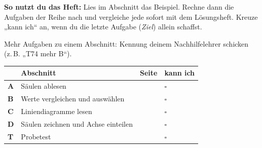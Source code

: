 \documentclass[11pt]{article}
\begin{document}
\par\smallskip
{}\par\medskip
\noindent\textbf{So nutzt du das Heft:} Lies im Abschnitt das Beispiel. Rechne dann die Aufgaben der Reihe nach und vergleiche jede sofort mit dem Lösungsheft. Kreuze „kann ich“ an, wenn du die letzte Aufgabe (\emph{Ziel}) allein schaffst.\par
\noindent Mehr Aufgaben zu einem Abschnitt: Kennung deinem Nachhilfelehrer schicken (z.\,B. „T74 mehr B“).\par\medskip
{\renewcommand{\arraystretch}{1.3}
\noindent\begin{tabular}{|>{\bfseries}p{10mm}|p{112mm}|>{\raggedleft\arraybackslash}p{10mm}|>{\centering\arraybackslash}p{14mm}|}\hline
\rowcolor{black!8} & \textbf{Abschnitt} & \textbf{Seite} & \textbf{kann ich}\\\hline
A & Säulen ablesen & \pageref{s:A} & $\square$\\\hline
B & Werte vergleichen und auswählen & \pageref{s:B} & $\square$\\\hline
C & Liniendiagramme lesen & \pageref{s:C} & $\square$\\\hline
D & Säulen zeichnen und Achse einteilen & \pageref{s:D} & $\square$\\\hline
T & Probetest & \pageref{s:T} & $\square$\\\hline
\end{tabular}}\par\bigskip
\end{document}
